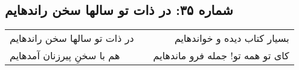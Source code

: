\begin{center}
\section*{شماره ۳۵: در ذات تو سالها سخن راندهایم}
\label{sec:035}
\begin{longtable}{l p{0.5cm} r}
در ذات تو سالها سخن راندهایم
&&
بسیار کتاب دیده و خواندهایم
\\
هم با سخنِ پیرزنان آمدهایم
&&
کای تو همه تو! جمله فرو ماندهایم
\\
\end{longtable}
\end{center}
